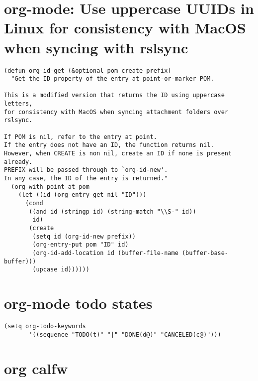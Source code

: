 \documentclass[11pt]{article}
\begin{document}
\section{org-mode: Use uppercase UUIDs in Linux for consistency with MacOS when syncing with rslsync}
\label{sec:org88d6118}
\begin{verbatim}
(defun org-id-get (&optional pom create prefix)
  "Get the ID property of the entry at point-or-marker POM.

This is a modified version that returns the ID using uppercase letters,
for consistency with MacOS when syncing attachment folders over rslsync.

If POM is nil, refer to the entry at point.
If the entry does not have an ID, the function returns nil.
However, when CREATE is non nil, create an ID if none is present already.
PREFIX will be passed through to `org-id-new'.
In any case, the ID of the entry is returned."
  (org-with-point-at pom
    (let ((id (org-entry-get nil "ID")))
      (cond
       ((and id (stringp id) (string-match "\\S-" id))
        id)
       (create
        (setq id (org-id-new prefix))
        (org-entry-put pom "ID" id)
        (org-id-add-location id (buffer-file-name (buffer-base-buffer)))
        (upcase id))))))
\end{verbatim}
\section{org-mode todo states}
\label{sec:org4222f96}
\begin{verbatim}
(setq org-todo-keywords
       '((sequence "TODO(t)" "|" "DONE(d@)" "CANCELED(c@)")))
\end{verbatim}
\section{org calfw}
\label{sec:orge7a7ba1}
\end{document}
